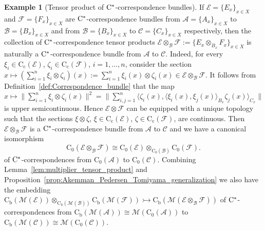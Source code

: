 \documentclass[11 pt, leqno]{amsart}
\numberwithin{equation}{section}
\theoremstyle{plain}
\theoremstyle{definition}
\newtheorem{ex}[thm]{Example}
\newcommand*{\contc}{\mathrm{C_c}}%
\newcommand*{\contz}{\mathrm{C_0}}%
\newcommand*{\contb}{\mathrm{C_b}}%
\newcommand{\B}{\mathcal B}
\newcommand{\M}{\mathcal M}
\newcommand{\CC}{\mathcal C}
\newcommand{\EE}{\mathcal E}
\newcommand{\FF}{\mathcal F}
\newcommand{\A}{\mathcal A}
\newcommand{\cst}{\ifmmode\mathrm{C}^*\else{$\mathrm{C}^*$}\fi}
\newcommand*{\into}{\rightarrowtail}
\begin{document}
\begin{ex}[Tensor product of $\cst$-correspondence bundles]\label{ex:tensor_bundles}
If $\EE=\{E_x\}_{x\in X}$ and $\FF=\{F_x\}_{x\in X}$ are $\cst$-correspondence bundles from  $\A=\{A_x\}_{x\in X}$ to $\B=\{B_x\}_{x\in X}$ and from $\B=\{B_x\}_{x\in X}$ to $\CC=\{C_x\}_{x\in X}$ respectively, then  the collection of $\cst$-correspondence tensor products $\EE\otimes_\B \FF:=\{E_x\otimes_{B_x} F_x\}_{x\in X}$ is naturally a  $\cst$-correspondence bundle from  $\A$  to $\CC$. 
Indeed, for every $\xi_i\in \contc(\EE)$, $\zeta_i\in \contc(\FF)$, $i=1, \ldots ,n$, consider the section $x\mapsto  (\sum_{i=1}^n\xi_i\otimes \zeta_i)(x) := \sum_{i=1}^n \xi_i(x)\otimes \zeta_i(x)\in \EE\otimes_\B \FF$. 
It follows from Definition~\ref{def:Correspondence_bundle} that the map $x\mapsto \|\sum_{i=1}^n\xi_i\otimes \zeta_i(x)\|^2=\|\sum_{i,j=1}^n\langle \zeta_i(x), \langle \xi_i(x),\xi_j(x)\rangle_{B_x} \zeta_j(x)\rangle_{C_x}\|$ is upper semicontinuous. 
Hence $\EE\otimes \FF$ can be equipped with a unique topology such that the sections $\xi\otimes \zeta$, $\xi\in \contc(\EE)$, $\zeta\in \contc(\FF)$, are continuous.
Then $\EE\otimes_\B \FF$ is a $\cst$-correspondence bundle from  $\A$ to $\CC$ and  we have a canonical isomorphism 
\[
    \contz(\EE\otimes_\B \FF)\cong \contz(\EE)\otimes_{\contz(\B)} \contz(\FF). %
\]
of $\cst$-correspondences from $\contz(\A)$ to $\contz(\CC)$. 
Combining Lemma~\ref{lem:multiplier_tensor_product} and Proposition~\ref{prop:Akemman_Pedersen_Tomiyama_generalization} we also have the embedding $\contb(\M(\EE))\otimes_{\contb(\M(\B))} \contb(\M(\FF))\into  \contb(\M(\EE\otimes_{\B} \FF))$ of $\cst$-correspondences from $\contb(\M(\A))\cong \M(\contz(\A))$ to $\contb(\M(\CC)) \cong \M(\contz(\CC))$. 
\end{ex}
\end{document}
